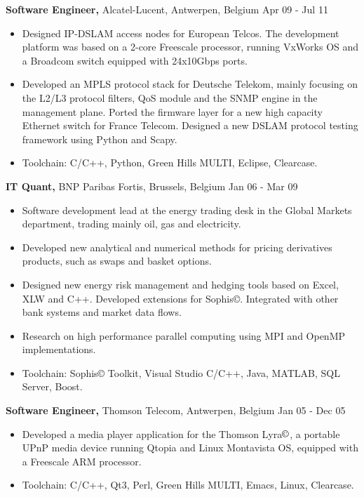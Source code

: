 \documentclass[margin]{res}
\begin{document}
\begin{resume}
{\bf Software Engineer,} Alcatel-Lucent, Antwerpen, Belgium \hfill  Apr 09 - Jul 11
\begin{itemize} \itemsep -2pt %
\item Designed IP-DSLAM access nodes for European Telcos. The development platform was based on a 2-core Freescale processor, running VxWorks OS and a Broadcom switch equipped with 24x10Gbps ports.
\item Developed an MPLS protocol stack for Deutsche Telekom, mainly focusing on the L2/L3 protocol filters, QoS module and the SNMP engine in the management plane. Ported the firmware layer for a new high capacity Ethernet switch for France Telecom. Designed a new DSLAM protocol testing framework using Python and Scapy.
\item Toolchain: C/C++, Python, Green Hills MULTI, Eclipse, Clearcase.
\end{itemize}

{\bf IT Quant,} BNP Paribas Fortis, Brussels, Belgium \hfill  Jan 06 - Mar 09
\begin{itemize} \itemsep -2pt %
\item Software development lead at the energy trading desk in the Global Markets department, trading mainly oil, gas and electricity.
\item Developed new analytical and numerical methods for pricing derivatives products, such as swaps and basket options.
\item Designed new energy risk management and hedging tools based on Excel, XLW and C++. Developed extensions for Sophis©. Integrated with other bank systems and market data flows.
\item Research on high performance parallel computing using MPI and OpenMP implementations.
\item Toolchain: Sophis© Toolkit, Visual Studio C/C++, Java, MATLAB, SQL Server, Boost.
\end{itemize}

{\bf Software Engineer,} Thomson Telecom, Antwerpen, Belgium \hfill  Jan 05 - Dec 05
\begin{itemize} \itemsep -2pt %
\item Developed a media player application for the Thomson Lyra$\copyright$, a portable UPnP media device running Qtopia and Linux Montavista OS, equipped with a Freescale ARM processor.
\item Toolchain: C/C++, Qt3, Perl, Green Hills MULTI, Emacs, Linux, Clearcase.
\end{itemize}


\end{resume}
\end{document}
